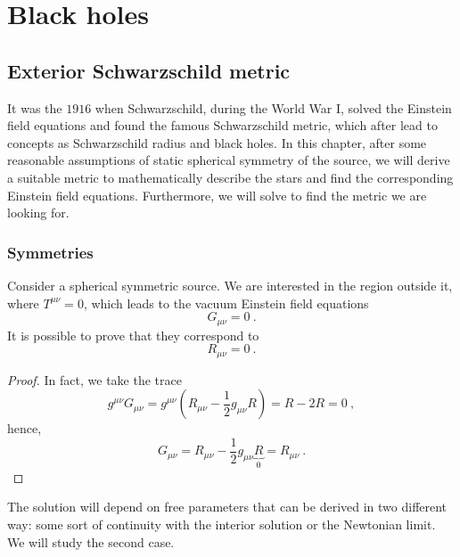 \part{Black holes}

\chapter{Exterior Schwarzschild metric} 

    It was the $1916$ when Schwarzschild, during the World War I, solved the Einstein field equations and found the famous Schwarzschild metric, which after lead to concepts as Schwarzschild radius and black holes. In this chapter, after some reasonable assumptions of static spherical symmetry of the source, we will derive a suitable metric to mathematically describe the stars and find the corresponding Einstein field equations. Furthermore, we will solve to find the metric we are looking for.

\section{Symmetries}

    Consider a spherical symmetric source. We are interested in the region outside it, where $T^{\mu\nu} = 0$, which leads to the vacuum Einstein field equations
    \begin{equation*}
        G_{\mu\nu} = 0 ~.
    \end{equation*}
    It is possible to prove that they correspond to 
    \begin{equation*}
        R_{\mu\nu} = 0 ~.
    \end{equation*}
    \begin{proof}
        In fact, we take the trace 
        \begin{equation*}
            g^{\mu\nu} G_{\mu\nu} = g^{\mu\nu} (R_{\mu\nu} - \frac{1}{2} g_{\mu\nu} R) = R - 2 R = 0 ~,
        \end{equation*}
        hence, 
        \begin{equation*}
            G_{\mu\nu} = R_{\mu\nu} - \frac{1}{2} g_{\mu\nu} \underbrace{R}_0 = R_{\mu\nu} ~.
        \end{equation*}
    \end{proof}
    The solution will depend on free parameters that can be derived in two different way: some sort of continuity with the interior solution or the Newtonian limit. We will study the second case.

